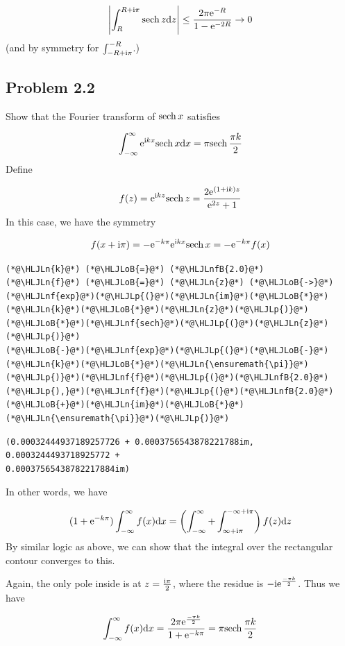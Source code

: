 \documentclass[12pt,a4paper]{article}
\newcommand{\HLJLn}[1]{#1}
\newcommand{\HLJLnf}[1]{\textcolor[RGB]{66,102,213}{#1}}
\newcommand{\HLJLnfB}[1]{\textcolor[RGB]{59,151,46}{#1}}
\newcommand{\HLJLoB}[1]{\textcolor[RGB]{102,102,102}{\textbf{#1}}}
\newcommand{\HLJLp}[1]{#1}
\def\D{ {\rm d} }
\def\I{ {\rm i} }
\def\E{ {\rm e} }
\def\sech{ {\rm sech}\, }
\def\dx{\D x}
\def\dz{\D z}
\begin{document}
\[
 \left|\int_R^{R+\I \pi} \sech z \dz \right| \leq {2 \pi \E^{-R} \over 1 - \E^{-2R}} \rightarrow 0
\]
(and by symmetry for $\int_{-R+\I \pi}^{-R}$.)

\subsection{Problem 2.2}
Show that the Fourier transform of $\sech x$ satisfies

\[
\int_{-\infty}^\infty \E^{\I k x } \sech x \dx = \pi \sech {\pi k \over 2}
\]
Define 

\[
f(z) = \E^{\I k z } \sech z = {2 \E^{(1+\I k) z} \over \E^{2 z } + 1}
\]
In this case, we have the symmetry

\[
f(x + \I \pi) = - \E^{- k \pi} \E^{\I k x} \sech x = - \E^{-k \pi} f(x)
\]

\begin{lstlisting}
(*@\HLJLn{k}@*) (*@\HLJLoB{=}@*) (*@\HLJLnfB{2.0}@*)
(*@\HLJLn{f}@*) (*@\HLJLoB{=}@*) (*@\HLJLn{z}@*) (*@\HLJLoB{->}@*) (*@\HLJLnf{exp}@*)(*@\HLJLp{(}@*)(*@\HLJLn{im}@*)(*@\HLJLoB{*}@*)(*@\HLJLn{k}@*)(*@\HLJLoB{*}@*)(*@\HLJLn{z}@*)(*@\HLJLp{)}@*)(*@\HLJLoB{*}@*)(*@\HLJLnf{sech}@*)(*@\HLJLp{(}@*)(*@\HLJLn{z}@*)(*@\HLJLp{)}@*)
(*@\HLJLoB{-}@*)(*@\HLJLnf{exp}@*)(*@\HLJLp{(}@*)(*@\HLJLoB{-}@*)(*@\HLJLn{k}@*)(*@\HLJLoB{*}@*)(*@\HLJLn{\ensuremath{\pi}}@*)(*@\HLJLp{)}@*)(*@\HLJLnf{f}@*)(*@\HLJLp{(}@*)(*@\HLJLnfB{2.0}@*)(*@\HLJLp{),}@*)(*@\HLJLnf{f}@*)(*@\HLJLp{(}@*)(*@\HLJLnfB{2.0}@*)(*@\HLJLoB{+}@*)(*@\HLJLn{im}@*)(*@\HLJLoB{*}@*)(*@\HLJLn{\ensuremath{\pi}}@*)(*@\HLJLp{)}@*)
\end{lstlisting}

\begin{lstlisting}
(0.00032444937189257726 + 0.0003756543878221788im, 0.0003244493718925772 + 
0.00037565438782217884im)
\end{lstlisting}


In other words, we have

\[
(1 + \E^{-k \pi}) \int_{-\infty}^\infty f(x) \dx =\left(\int_{-\infty}^\infty +  \int_{\infty+\I \pi}^{-\infty + \I \pi}\right) f(z) \dz 
\]
By similar logic as above, we can show that the integral over the rectangular contour converges to this.

Again, the only pole inside is at $z = {\I \pi \over 2}$, where the residue is $-\I \E^{-\pi k \over 2}$. Thus we have

\[
\int_{-\infty}^\infty f(x) \dx = {2 \pi \E^{-\pi k \over 2} \over 1 + \E^{-k \pi}} = \pi \sech{\pi k \over 2}
\]
\end{document}
